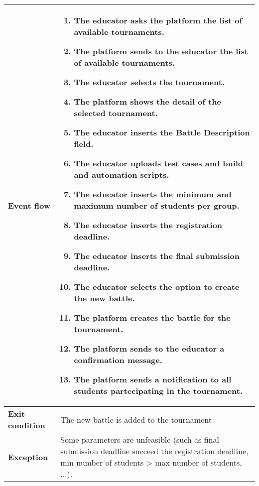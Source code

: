 \begin{enumerate}[label=\textbf{UC\arabic*}:,ref=UC\arabic*,leftmargin=1.3cm]
{\begin{table}[H]
\begin{tabular}{|l|p{11.9cm}|}
                        \textbf{Event flow}      &
                        \begin{enumerate}[label=\arabic*.]
                              \item The educator asks the platform the list of available tournaments.
                              \item The platform sends to the educator the list of available tournaments.
                              \item The educator selects the tournament.
                              \item The platform shows the detail of the selected tournament.
                              \item The educator inserts the Battle Description field.
                              \item The educator uploads test cases and build and automation scripts.
                              \item The educator inserts the minimum and maximum number of students per group.
                              \item The educator inserts the registration deadline.
                              \item The educator inserts the final submission deadline.
                              \item The educator selects the option to create the new battle.
                              \item The platform creates the battle for the tournament.
                              \item The platform sends to the educator a confirmation message.
                              \item The platform sends a notification to all students partecipating in the tournament.
                        \end{enumerate}                                                                                                \\\hline
                        \textbf{Exit condition}  & The new battle is added to the tournament                                                                                                                   \\\hline
                        \textbf{Exception}       & Some parameters are unfeasible (such as final submission deadline succeed the registration deadline, min number of students > max number of students, ...).

\end{tabular}
\end{table}}
\end{enumerate}
